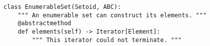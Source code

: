 \begin{verbatim}
class EnumerableSet(Setoid, ABC):
    """ An enumerable set can construct its elements. """
    @abstractmethod
    def elements(self) -> Iterator[Element]:
        """ This iterator could not terminate. """
\end{verbatim}